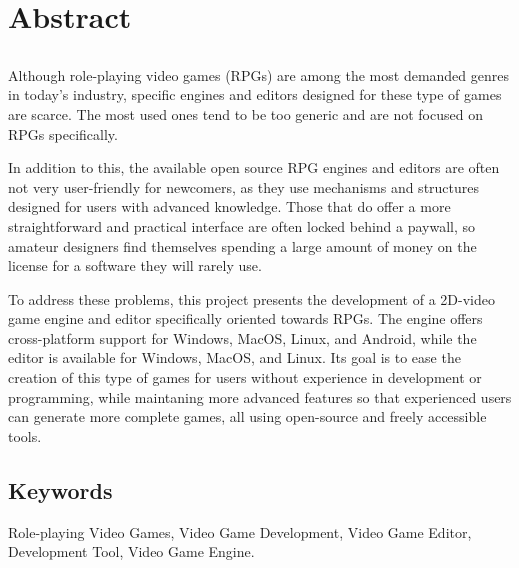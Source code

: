 \chapter*{Abstract}

\section*{\tituloPortadaEngVal}

Although role-playing video games (RPGs) are among the most demanded genres in today's industry, specific engines and editors designed for these type of games are scarce. The most used ones tend to be too generic and are not focused on RPGs specifically.

\smallskip

In addition to this, the available open source RPG engines and editors are often not very user-friendly for newcomers, as they use mechanisms and structures designed for users with advanced knowledge. Those that do offer a more straightforward and practical interface are often locked behind a paywall, so amateur designers find themselves spending a large amount of money on the license for a software they will rarely use.

\medskip

To address these problems, this project presents the development of a 2D-video game engine and editor specifically oriented towards RPGs. The engine offers cross-platform support for Windows, MacOS, Linux, and Android, while the editor is available for Windows, MacOS, and Linux. Its goal is to ease the creation of this type of games for users without experience in development or programming, while maintaning more advanced features so that experienced users can generate more complete games, all using open-source and freely accessible tools.


\section*{Keywords}

\noindent Role-playing Video Games, Video Game Development, Video Game Editor, Development Tool, Video Game Engine.



